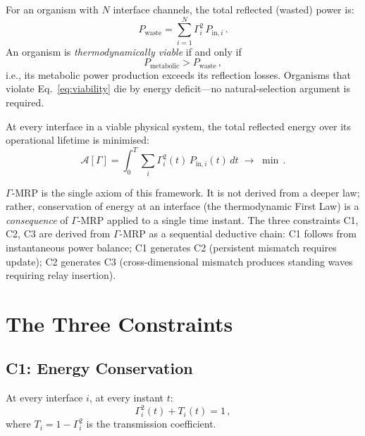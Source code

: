 \documentclass[aps,pre,twocolumn,superscriptaddress,floatfix]{revtex4-2}
\begin{document}
For an organism with $N$ interface channels, the total
reflected (wasted) power is:
\begin{equation}
  P_{\text{waste}} = \sum_{i=1}^{N} \Gamma_i^2\,
  P_{\text{in},i}\,.
  \label{eq:waste}
\end{equation}
An organism is \emph{thermodynamically viable} if and
only if
\begin{equation}
  P_{\text{metabolic}} > P_{\text{waste}}\,,
  \label{eq:viability}
\end{equation}
i.e., its metabolic power production exceeds its
reflection losses.
Organisms that violate Eq.~\eqref{eq:viability} die
by energy deficit---no natural-selection argument
is required.

\begin{axiom}
\label{ax:mrp}
At every interface in a viable physical system, the
total reflected energy over its operational lifetime
is minimised:
\begin{equation}
  \boxed{
  \mathcal{A}[\Gamma]
  = \int_0^T \sum_i \Gamma_i^2(t)\,P_{\text{in},i}(t)\,dt
  \;\to\;\min\,.
  }
  \label{eq:action}
\end{equation}
\end{axiom}

\noindent
$\Gamma$-MRP is the single axiom of this framework.
It is not derived from a deeper law; rather,
conservation of energy at an interface
(the thermodynamic First Law) is a \emph{consequence}
of $\Gamma$-MRP applied to a single time instant.
The three constraints C1, C2, C3 are derived from
$\Gamma$-MRP as a sequential deductive chain:
C1 follows from instantaneous power balance;
C1 generates C2 (persistent mismatch requires update);
C2 generates C3 (cross-dimensional mismatch produces
standing waves requiring relay insertion).


\section{The Three Constraints}
\label{sec:constraints}

\subsection{C1: Energy Conservation}
\label{sec:c1}

\begin{theorem}[C1]
\label{thm:c1}
At every interface $i$, at every instant $t$:
\begin{equation}
  \Gamma_i^2(t) + T_i(t) = 1\,,
  \label{eq:c1}
\end{equation}
where $T_i = 1 - \Gamma_i^2$ is the transmission
coefficient.
\end{theorem}
\end{document}
